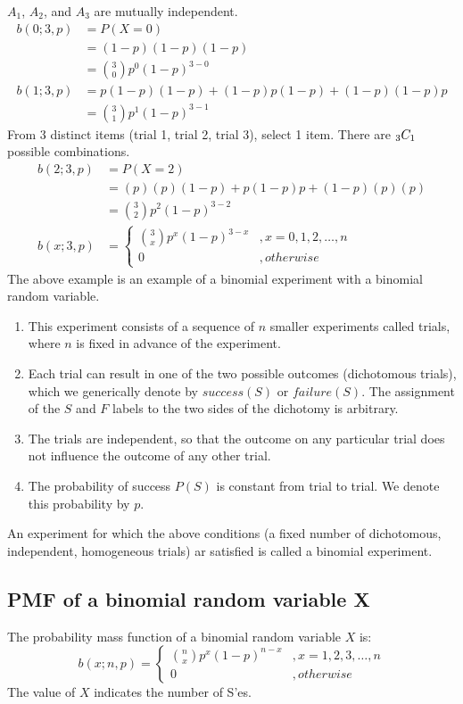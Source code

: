 \documentclass[letterpaper, 12pt]{math}
\begin{document}
\( A_{1} \), \( A_{2} \), and \( A_{3} \) are mutually independent.
\begin{align*}
  b(0;3,p) &= P(X=0) \\
  &= (1-p)(1-p)(1-p) \\
  &= \binom{3}{0}p^{0}(1-p)^{3-0} \\
  b(1;3,p) &= p(1-p)(1-p)+(1-p)p(1-p)+(1-p)(1-p)p \\
  &= \binom{3}{1}p^{1}(1-p)^{3-1}
\end{align*}
From 3 distinct items (trial 1, trial 2, trial 3), select 1 item. There are
\( _{3}C_{1} \) possible combinations.
\begin{align*}
  b(2;3,p) &= P(X=2) \\
  &= (p)(p)(1-p)+p(1-p)p+(1-p)(p)(p) \\
  &= \binom{3}{2}p^{2}(1-p)^{3-2} \\
  b(x;3,p) &=
  \begin{cases}
    \binom{3}{x}p^{x}(1-p)^{3-x} &, x = 0,1,2,\dots,n \\
    0 &, otherwise
  \end{cases}
\end{align*}
The above example is an example of a binomial experiment with a binomial random
variable.
\begin{enumerate}
  \item This experiment consists of a sequence of \( n \) smaller experiments
    called trials, where \( n \) is fixed in advance of the experiment.
  \item Each trial can result in one of the two possible outcomes (dichotomous
    trials), which we generically denote by \( success(S) \) or
    \( failure(S) \). The assignment of the \( S \) and \( F \) labels to the
    two sides of the dichotomy is arbitrary.
  \item The trials are independent, so that the outcome on any particular trial
    does not influence the outcome of any other trial.
  \item The probability of success \( P(S) \) is constant from trial to trial.
    We denote this probability by \( p \).
\end{enumerate}
An experiment for which the above conditions (a fixed number of dichotomous,
independent, homogeneous trials) ar satisfied is called a binomial experiment.

\subsection*{PMF of a binomial random variable X}
The probability mass function of a binomial random variable \( X \) is:
\[ b(x;n,p) =
  \begin{cases}
    \binom{n}{x}p^{x}(1-p)^{n-x} &, x = 1,2,3,\dots,n \\
    0 &, otherwise
  \end{cases}
\]
The value of \( X \) indicates the number of S'es. \par
\end{document}
